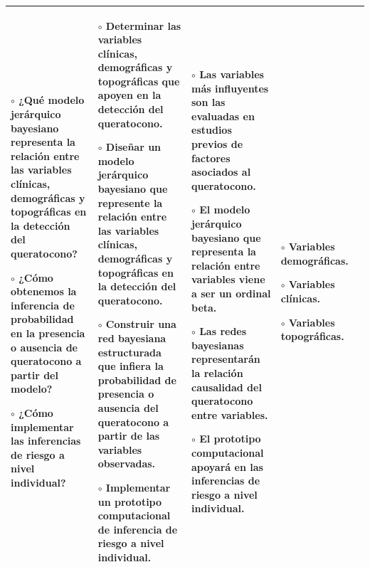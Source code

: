 \begin{landscape}
\begin{table}[h!]
\begin{tabular}{|p{4.2cm}|p{4.5cm}|p{4.5cm}|p{3cm}|p{4.2cm}|}
{    $\circ$ ¿Qué modelo jerárquico bayesiano representa la relación entre las variables clínicas, demográficas y topográficas en la detección del queratocono?\vspace{0.2cm}

    $\circ$ ¿Cómo obtenemos la inferencia de probabilidad en la presencia o ausencia de queratocono a partir del modelo?\vspace{0.2cm}

    $\circ$ ¿Cómo implementar las inferencias de riesgo a nivel individual?} & \multicolumn{1}{p{4.5cm}|}{
    $\circ$ Determinar las variables clínicas, demográficas y topográficas que apoyen en la detección del queratocono.\vspace{0.2cm}

    $\circ$ Diseñar un modelo jerárquico bayesiano que represente la relación entre las variables clínicas, demográficas y topográficas en la detección del queratocono.\vspace{0.2cm}

    $\circ$ Construir una red bayesiana estructurada que infiera la probabilidad de presencia o ausencia del queratocono a partir de las variables observadas.\vspace{0.2cm}

    $\circ$ Implementar un prototipo computacional de inferencia de riesgo a nivel individual.

    } & \multicolumn{1}{p{4.5cm}|}{
    $\circ$ Las variables más influyentes son las evaluadas en estudios previos de factores asociados al queratocono.\vspace{0.2cm}

    $\circ$ El modelo jerárquico bayesiano que representa la relación entre variables viene a ser un ordinal beta.\vspace{0.2cm}

    $\circ$ Las redes bayesianas representarán la relación causalidad del queratocono entre variables.\vspace{0.2cm}

    $\circ$ El prototipo computacional apoyará en las inferencias de riesgo a nivel individual.\vspace{0.2cm}

    } & \multicolumn{1}{p{3cm}|}{
    \vspace{0.2cm}
    $\circ$ Variables demográficas.\vspace{0.2cm}

    $\circ$ Variables clínicas.\vspace{0.2cm}

    $\circ$ Variables topográficas.
    }  & \\ \hline
\end{tabular}
\end{table}

\end{landscape}

